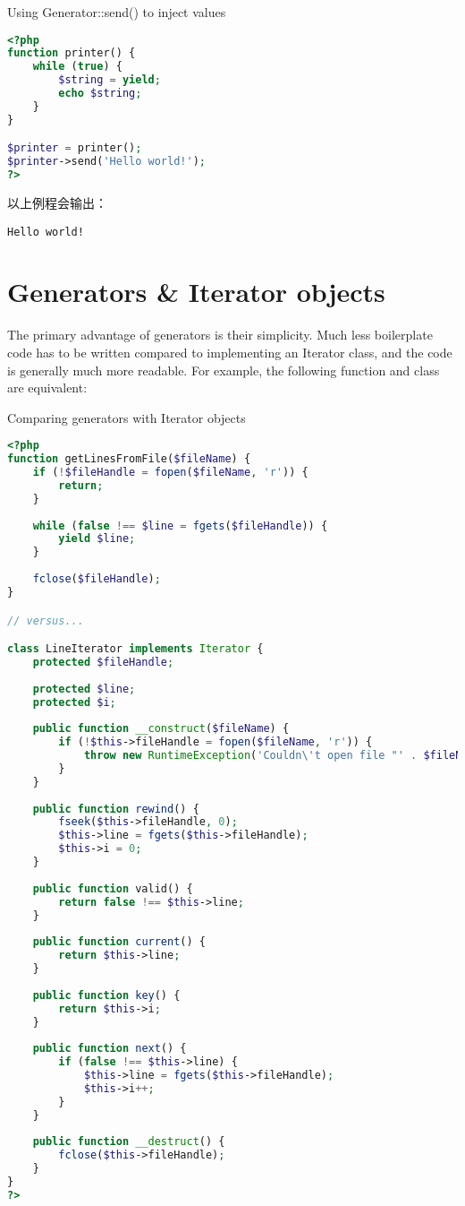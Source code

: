 \begin{example}
Using Generator::send() to inject values
\begin{lstlisting}[language=PHP]
<?php
function printer() {
    while (true) {
        $string = yield;
        echo $string;
    }
}

$printer = printer();
$printer->send('Hello world!');
?>
\end{lstlisting}
\end{example}

以上例程会输出：

\begin{verbatim}
Hello world!
\end{verbatim}


\section{Generators \& Iterator objects}

The primary advantage of generators is their simplicity. Much less boilerplate code has to be written compared to implementing an Iterator class, and the code is generally much more readable. For example, the following function and class are equivalent:


\begin{example}
Comparing generators with Iterator objects
\begin{lstlisting}[language=PHP]
<?php
function getLinesFromFile($fileName) {
    if (!$fileHandle = fopen($fileName, 'r')) {
        return;
    }
 
    while (false !== $line = fgets($fileHandle)) {
        yield $line;
    }
 
    fclose($fileHandle);
}

// versus...

class LineIterator implements Iterator {
    protected $fileHandle;
 
    protected $line;
    protected $i;
 
    public function __construct($fileName) {
        if (!$this->fileHandle = fopen($fileName, 'r')) {
            throw new RuntimeException('Couldn\'t open file "' . $fileName . '"');
        }
    }
 
    public function rewind() {
        fseek($this->fileHandle, 0);
        $this->line = fgets($this->fileHandle);
        $this->i = 0;
    }
 
    public function valid() {
        return false !== $this->line;
    }
 
    public function current() {
        return $this->line;
    }
 
    public function key() {
        return $this->i;
    }
 
    public function next() {
        if (false !== $this->line) {
            $this->line = fgets($this->fileHandle);
            $this->i++;
        }
    }
 
    public function __destruct() {
        fclose($this->fileHandle);
    }
}
?>
\end{lstlisting}
\end{example}

